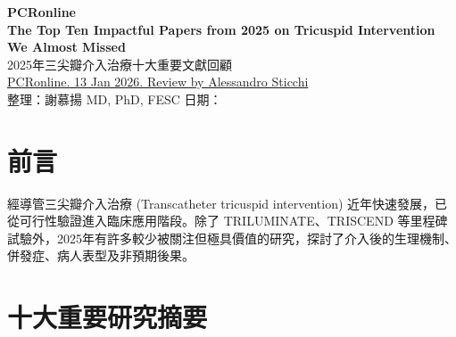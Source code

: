 \documentclass[12pt,a4paper]{article}
\begin{document}
\begin{center}
{\LARGE\bfseries\textcolor{emergency_red}{PCRonline}}\\[0.5cm]
{\Large\textbf{The Top Ten Impactful Papers from 2025 on Tricuspid Intervention We Almost Missed}}\\[0.3cm]
{\large 2025年三尖瓣介入治療十大重要文獻回顧}\\[0.5cm]
{\normalsize \href{https://www.pcronline.com/News/Whats-new-on-PCRonline/2026/The-top-ten-impactful-papers-on-tricuspid-intervention-we-almost-missed}{PCRonline. 13 Jan 2026. Review by Alessandro Sticchi}}\\[0.3cm]
{\normalsize 整理：謝慕揚 MD, PhD, FESC \quad 日期：\mydate}
\end{center}

\vspace{0.5cm}

\section{前言}

經導管三尖瓣介入治療 (Transcatheter tricuspid intervention) 近年快速發展，已從可行性驗證進入臨床應用階段。除了 TRILUMINATE、TRISCEND 等里程碑試驗外，2025年有許多較少被關注但極具價值的研究，探討了介入後的生理機制、併發症、病人表型及非預期後果。


\section{十大重要研究摘要}
\end{document}
